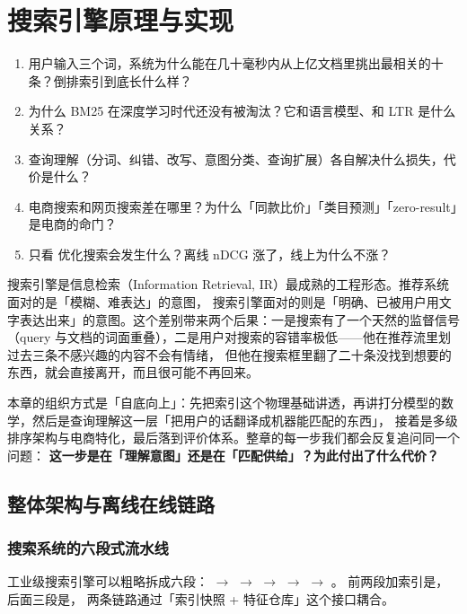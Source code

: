 \chapter{搜索引擎原理与实现}
\label{ch:search}

\begin{insight}[本章要解决的问题]
\begin{enumerate}
  \item 用户输入三个词，系统为什么能在几十毫秒内从上亿文档里挑出最相关的十条？倒排索引到底长什么样？
  \item 为什么 BM25 在深度学习时代还没有被淘汰？它和语言模型、和 LTR 是什么关系？
  \item 查询理解（分词、纠错、改写、意图分类、查询扩展）各自解决什么损失，代价是什么？
  \item 电商搜索和网页搜索差在哪里？为什么「同款比价」「类目预测」「zero-result」是电商的命门？
  \item 只看  优化搜索会发生什么？离线 nDCG 涨了，线上为什么不涨？
\end{enumerate}
\end{insight}

搜索引擎是信息检索（Information Retrieval, IR）最成熟的工程形态。推荐系统面对的是「模糊、难表达」的意图，
搜索引擎面对的则是「明确、已被用户用文字表达出来」的意图。这个差别带来两个后果：一是搜索有了一个天然的监督信号
（query 与文档的词面重叠），二是用户对搜索的容错率极低——他在推荐流里划过去三条不感兴趣的内容不会有情绪，
但他在搜索框里翻了二十条没找到想要的东西，就会直接离开，而且很可能不再回来。

本章的组织方式是「自底向上」：先把索引这个物理基础讲透，再讲打分模型的数学，然后是查询理解这一层「把用户的话翻译成机器能匹配的东西」，
接着是多级排序架构与电商特化，最后落到评价体系。整章的每一步我们都会反复追问同一个问题：
\textbf{这一步是在「理解意图」还是在「匹配供给」？为此付出了什么代价？}

\section{整体架构与离线在线链路}

\subsection{搜索系统的六段式流水线}

工业级搜索引擎可以粗略拆成六段： $\to$  $\to$  $\to$  $\to$  $\to$ 。
前两段加索引是，后面三段是，
两条链路通过「索引快照 + 特征仓库」这个接口耦合。

